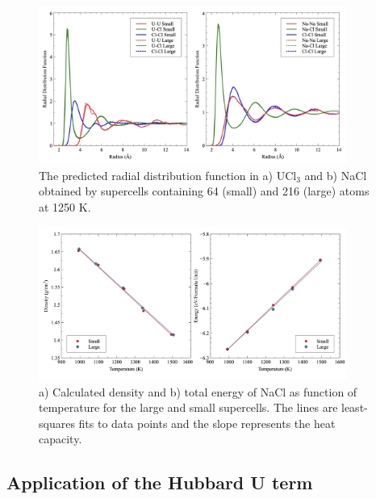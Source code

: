 \documentclass[preprint,3p,10pt,onecolumn,number,sort&compress]{elsarticle}
\begin{document}
{%


\begin{figure}[htb]
\centering
\includegraphics[width=0.9\textwidth]{fig1.jpg}
\caption{The predicted radial distribution function in a) UCl$_3$ and b) NaCl obtained by supercells containing 64 (small) and 216 (large) atoms at 1250 K.} 
\label{fig:radial}
\end{figure}

\begin{figure}[htb]
\centering
\includegraphics[width=0.9\textwidth]{fig4.jpg}
\caption{a) Calculated density and b) total energy of NaCl as function of temperature for the large and small supercells. The lines are least-squares fits to data points and the slope represents the heat capacity.} 
\label{fig:NaClsize}
\end{figure}




\subsection{Application of the Hubbard U term}

}
\end{document}
